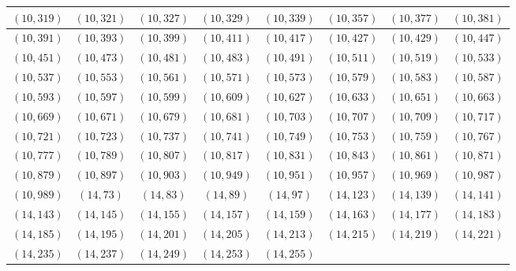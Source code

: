 \documentclass[11pt,reqno]{amsart}
\theoremstyle{definition}
\begin{document}
\begin{longtable}{|c|c|c|c|c|c|c|c|}
\\ \hline
$ ( 10 , 319 )$
 & 
$ ( 10 , 321 )$
 & 
$ ( 10 , 327 )$
 & 
$ ( 10 , 329 )$
 & 
$ ( 10 , 339 )$
 & 
$ ( 10 , 357 )$
 & 
$ ( 10 , 377 )$
 & 
$ ( 10 , 381 )$
\\ \hline
$ ( 10 , 391 )$
 & 
$ ( 10 , 393 )$
 & 
$ ( 10 , 399 )$
 & 
$ ( 10 , 411 )$
 & 
$ ( 10 , 417 )$
 & 
$ ( 10 , 427 )$
 & 
$ ( 10 , 429 )$
 & 
$ ( 10 , 447 )$
\\ \hline
$ ( 10 , 451 )$
 & 
$ ( 10 , 473 )$
 & 
$ ( 10 , 481 )$
 & 
$ ( 10 , 483 )$
 & 
$ ( 10 , 491 )$
 & 
$ ( 10 , 511 )$
 & 
$ ( 10 , 519 )$
 & 
$ ( 10 , 533 )$
\\ \hline
$ ( 10 , 537 )$
 & 
$ ( 10 , 553 )$
 & 
$ ( 10 , 561 )$
 & 
$ ( 10 , 571 )$
 & 
$ ( 10 , 573 )$
 & 
$ ( 10 , 579 )$
 & 
$ ( 10 , 583 )$
 & 
$ ( 10 , 587 )$
\\ \hline
$ ( 10 , 593 )$
 & 
$ ( 10 , 597 )$
 & 
$ ( 10 , 599 )$
 & 
$ ( 10 , 609 )$
 & 
$ ( 10 , 627 )$
 & 
$ ( 10 , 633 )$
 & 
$ ( 10 , 651 )$
 & 
$ ( 10 , 663 )$
\\ \hline
$ ( 10 , 669 )$
 & 
$ ( 10 , 671 )$
 & 
$ ( 10 , 679 )$
 & 
$ ( 10 , 681 )$
 & 
$ ( 10 , 703 )$
 & 
$ ( 10 , 707 )$
 & 
$ ( 10 , 709 )$
 & 
$ ( 10 , 717 )$
\\ \hline
$ ( 10 , 721 )$
 & 
$ ( 10 , 723 )$
 & 
$ ( 10 , 737 )$
 & 
$ ( 10 , 741 )$
 & 
$ ( 10 , 749 )$
 & 
$ ( 10 , 753 )$
 & 
$ ( 10 , 759 )$
 & 
$ ( 10 , 767 )$
\\ \hline
$ ( 10 , 777 )$
 & 
$ ( 10 , 789 )$
 & 
$ ( 10 , 807 )$
 & 
$ ( 10 , 817 )$
 & 
$ ( 10 , 831 )$
 & 
$ ( 10 , 843 )$
 & 
$ ( 10 , 861 )$
 & 
$ ( 10 , 871 )$
\\ \hline
$ ( 10 , 879 )$
 & 
$ ( 10 , 897 )$
 & 
$ ( 10 , 903 )$
 & 
$ ( 10 , 949 )$
 & 
$ ( 10 , 951 )$
 & 
$ ( 10 , 957 )$
 & 
$ ( 10 , 969 )$
 & 
$ ( 10 , 987 )$
\\ \hline
$ ( 10 , 989 )$
 & 
$ ( 14 , 73 )$
 & 
$ ( 14 , 83 )$
 & 
$ ( 14 , 89 )$
 & 
$ ( 14 , 97 )$
 & 
$ ( 14 , 123 )$
 & 
$ ( 14 , 139 )$
 & 
$ ( 14 , 141 )$
\\ \hline
$ ( 14 , 143 )$
 & 
$ ( 14 , 145 )$
 & 
$ ( 14 , 155 )$
 & 
$ ( 14 , 157 )$
 & 
$ ( 14 , 159 )$
 & 
$ ( 14 , 163 )$
 & 
$ ( 14 , 177 )$
 & 
$ ( 14 , 183 )$
\\ \hline
$ ( 14 , 185 )$
 & 
$ ( 14 , 195 )$
 & 
$ ( 14 , 201 )$
 & 
$ ( 14 , 205 )$
 & 
$ ( 14 , 213 )$
 & 
$ ( 14 , 215 )$
 & 
$ ( 14 , 219 )$
 & 
$ ( 14 , 221 )$
\\ \hline
$ ( 14 , 235 )$
 & 
$ ( 14 , 237 )$
 & 
$ ( 14 , 249 )$
 & 
$ ( 14 , 253 )$
 & 
$ ( 14 , 255 )$

\end{longtable}
\end{document}
